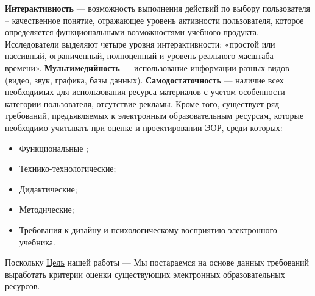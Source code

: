 \textbf{Интерактивность} --- возможность выполнения действий по выбору пользователя – качественное понятие, отражающее уровень активности пользователя, которое определяется функциональными возможностями учебного продукта.
Исследователи выделяют четыре уровня интерактивности: «простой или пассивный, ограниченный, полноценный и уровень реального масштаба времени»\cite{kochisov15}.
\textbf{Мультимедийность} --- использование информации разных видов (видео, звук, графика, базы данных).
\textbf{Самодостаточность} --- наличие всех необходимых для использования ресурса материалов с учетом особенности категории пользователя, отсутствие рекламы.
Кроме того, существует ряд требований\cite[c. 85-90]{larin}, предъявляемых к электронным образовательным ресурсам, которые необходимо учитывать при оценке и проектировании ЭОР, среди которых:
\begin{itemize}
\item Функциональные ;
\item Технико-технологические;
\item Дидактические;
\item Методические;
\item Требования к дизайну и психологическому восприятию электронного учебника.
\end{itemize}

Поскольку \hyperref[goal]{Цель} нашей работы ---  Мы постараемся на основе данных требований выработать критерии оценки существующих электронных образовательных ресурсов.

